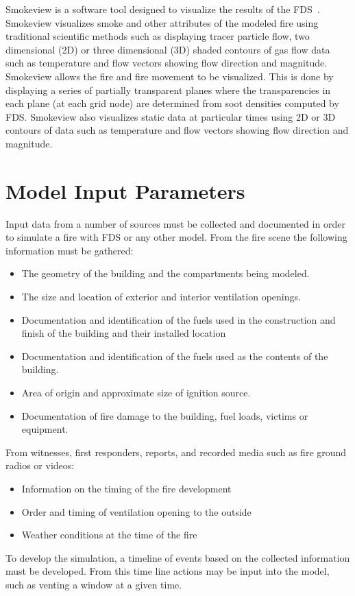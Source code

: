 \documentclass[11pt,oneside]{book}
\begin{document}
Smokeview is a software tool designed to visualize the results of the FDS~\cite{Smokeview_Users_Guide}.  Smokeview visualizes smoke and other attributes of the modeled fire using traditional scientific methods such as displaying tracer particle flow, two dimensional (2D) or three dimensional (3D) shaded contours of gas flow data such as temperature and flow vectors showing flow direction and magnitude.  Smokeview allows the fire and fire movement to be visualized.  This is done by displaying a series of partially transparent planes where the transparencies in each plane (at each grid node) are determined from soot densities computed by FDS.  Smokeview also visualizes static data at particular times using 2D or 3D contours of data such as temperature and flow vectors showing flow direction and magnitude.


\chapter{Model Input Parameters}
Input data from a number of sources must be collected and documented in order to simulate a fire with FDS or any other model. 
From the fire scene the following information must be gathered:
\begin{itemize}
\item The geometry of the building and the compartments being modeled.
\item The size and location of exterior and interior ventilation openings. 
\item Documentation and identification of the fuels used in the construction and finish of the building and their installed location
\item Documentation and identification of the fuels used as the contents of the building. 
\item Area of origin and approximate size of ignition source.
\item Documentation of fire damage to the building, fuel loads, victims or equipment.
\end{itemize}
From witnesses, first responders, reports, and recorded media such as fire ground radios or videos:
\begin{itemize}
\item Information on the timing of the fire development
\item Order and timing of ventilation opening to the outside
\item Weather conditions at the time of the fire
\end{itemize}
To develop the simulation, a timeline of events based on the collected information must be developed.   From this time line actions may be input into the model, such as venting a window at a given time. 
  
\end{document}
